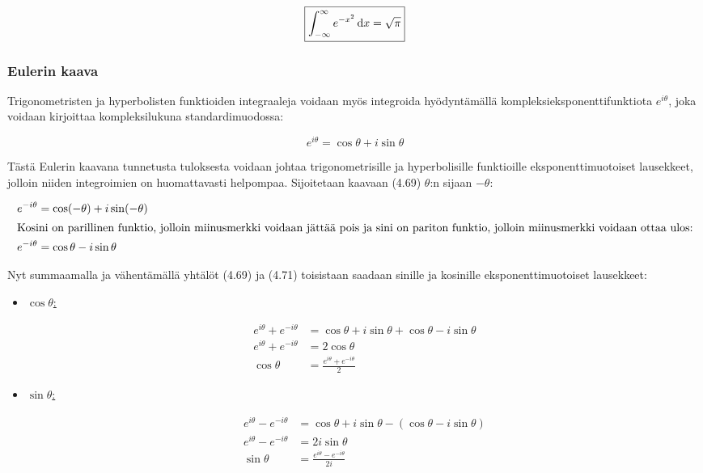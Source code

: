\documentclass[../integrointiopas.tex]{subfiles}
\begin{document}
	\begin{equation}
		\boxed{\int_{-\infty}^{\infty}e^{-x^2}\odif{x} = \sqrt{\pi}}
	\end{equation}

	\subsubsection{Eulerin kaava}
	
	Trigonometristen ja hyperbolisten funktioiden integraaleja voidaan myös integroida hyödyntämällä kompleksieksponenttifunktiota $e^{i\theta}$, joka voidaan kirjoittaa kompleksilukuna standardimuodossa:
	
	\begin{equation}
		e^{i\theta} = \cos\theta + i\sin\theta
	\end{equation}

	Tästä Eulerin kaavana tunnetusta tuloksesta voidaan johtaa trigonometrisille ja hyperbolisille funktioille eksponenttimuotoiset lausekkeet, jolloin niiden integroimien on huomattavasti helpompaa. Sijoitetaan kaavaan (4.69) $\theta$:n sijaan $-\theta$:
	
	\begin{align}
		e^{-i\theta} &= \cos(-\theta) + i\sin(-\theta) \\
		\intertext{Kosini on parillinen funktio, jolloin miinusmerkki voidaan jättää pois ja sini on pariton funktio, jolloin miinusmerkki voidaan ottaa ulos:}
		e^{-i\theta} &= \cos\theta - i\sin\theta
	\end{align}

	\noindent Nyt summaamalla ja vähentämällä yhtälöt (4.69) ja (4.71) toisistaan saadaan sinille ja kosinille eksponenttimuotoiset lausekkeet:
	
	\begin{itemize}
		\item \underline{$\cos\theta$:}
		
		\begin{align}
			e^{i\theta} + e^{-i\theta} &= \cos\theta + i\sin\theta + \cos\theta - i\sin\theta \\
			e^{i\theta} + e^{-i\theta} &= 2\cos\theta \\
			\cos\theta &= \frac{e^{i\theta} + e^{-i\theta}}{2}
		\end{align}
		
		\item \underline{$\sin\theta$:}
		
		\begin{align}
			e^{i\theta} - e^{-i\theta} &= \cos\theta + i\sin\theta - (\cos\theta - i\sin\theta) \\
			e^{i\theta} - e^{-i\theta} &= 2i\sin\theta \\
			\sin\theta &= \frac{e^{i\theta} - e^{-i\theta}}{2i}
		\end{align}
	\end{itemize}
\end{document}
